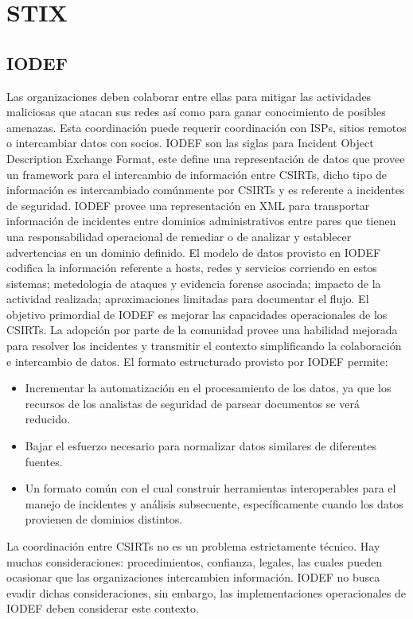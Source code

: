 
\chapter{STIX} 
\label{Chapter4}


\section{IODEF}

Las organizaciones deben colaborar entre ellas para mitigar las actividades 
maliciosas que atacan sus redes así como para ganar conocimiento de posibles 
amenazas. Esta coordinación puede requerir coordinación con ISPs, sitios remotos 
o intercambiar datos con socios. 
IODEF son las siglas para Incident Object Description Exchange Format, este 
define una representación de datos que provee un framework para el intercambio 
de información entre CSIRTs, dicho tipo de información es intercambiado 
comúnmente por CSIRTs y es referente a incidentes de seguridad. IODEF provee una 
representación en XML para transportar información de incidentes entre dominios 
administrativos entre pares que tienen una responsabilidad operacional de 
remediar o de analizar y establecer advertencias en un dominio definido. El 
modelo de datos provisto en IODEF codifica la información referente a hosts, 
redes y servicios corriendo en estos sistemas; metedologia de ataques y 
evidencia forense asociada; impacto de la actividad realizada; aproximaciones 
limitadas para documentar el flujo.
El objetivo primordial de IODEF es mejorar las capacidades operacionales de los 
CSIRTs. La adopción por parte de la comunidad provee una habilidad mejorada para 
resolver los incidentes y transmitir el contexto  simplificando la colaboración 
e intercambio de datos. El formato estructurado provisto por IODEF permite:
\begin{itemize}
  \item Incrementar la automatización en el procesamiento de los datos, ya que 
  los recursos de los analistas de seguridad de parsear documentos se verá 
  reducido.
  \item Bajar el esfuerzo necesario para normalizar datos similares de 
  diferentes fuentes.
  \item Un formato común con el cual construir herramientas interoperables para 
  el manejo de incidentes y análisis subsecuente, específicamente cuando los 
  datos provienen de dominios distintos.
\end{itemize}
La coordinación entre CSIRTs no es un problema estrictamente técnico. Hay muchas 
consideraciones: procedimientos, confianza, legales, las cuales pueden ocasionar 
que las organizaciones intercambien información. IODEF no busca evadir dichas 
consideraciones, sin embargo, las implementaciones operacionales de IODEF deben 
considerar este contexto.

